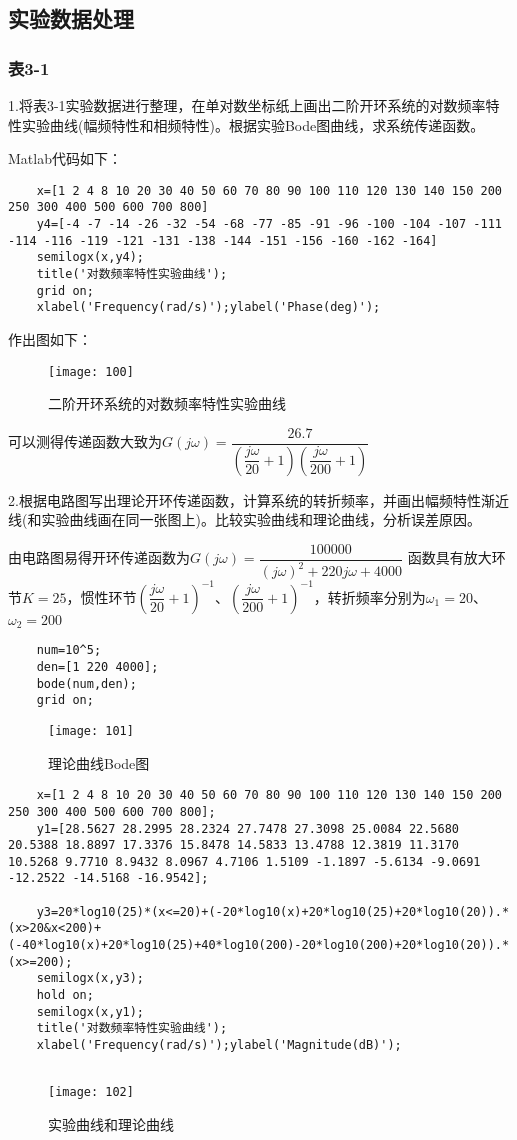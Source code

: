 \documentclass[UTF8,a4paper,10pt]{ctexart}
\begin{document}
\subsection{实验数据处理}
	\subsubsection{表3-1}
	1.将表3-1实验数据进行整理，在单对数坐标纸上画出二阶开环系统的对数频率特性实验曲线(幅频特性和相频特性)。根据实验Bode图曲线，求系统传递函数。
	
	Matlab代码如下：
    \begin{lstlisting}
    x=[1 2 4 8 10 20 30 40 50 60 70 80 90 100 110 120 130 140 150 200 250 300 400 500 600 700 800] 
    y4=[-4 -7 -14 -26 -32 -54 -68 -77 -85 -91 -96 -100 -104 -107 -111 -114 -116 -119 -121 -131 -138 -144 -151 -156 -160 -162 -164]
    semilogx(x,y4);
    title('对数频率特性实验曲线');
    grid on;
    xlabel('Frequency(rad/s)');ylabel('Phase(deg)');
    \end{lstlisting}
    作出图如下：
    \begin{figure}[h]
    	\centering
    	\texttt{[image: 100]}
    	\caption{二阶开环系统的对数频率特性实验曲线}
    \end{figure}
	可以测得传递函数大致为$G(j\omega)=\dfrac{26.7}{(\dfrac{j\omega}{20}+1)(\dfrac{j\omega}{200}+1)}$
	
	2.根据电路图写出理论开环传递函数，计算系统的转折频率，并画出幅频特性渐近线(和实验曲线画在同一张图上)。比较实验曲线和理论曲线，分析误差原因。
	
	由电路图易得开环传递函数为$G(j\omega)=\dfrac{100000}{(j\omega)^2+220j\omega+4000}$
	函数具有放大环节$K=25$，惯性环节$(\dfrac{j\omega}{20}+1)^{-1}$、$(\dfrac{j\omega}{200}+1)^{-1}$，转折频率分别为$\omega_{1}=20$、$\omega_{2}=200$
	\begin{lstlisting}
	num=10^5;
	den=[1 220 4000];
	bode(num,den);
	grid on;
	\end{lstlisting}
	\begin{figure}[h]
		\centering
		\texttt{[image: 101]}
		\caption{理论曲线Bode图}
	\end{figure}
	\begin{lstlisting}
	x=[1 2 4 8 10 20 30 40 50 60 70 80 90 100 110 120 130 140 150 200 250 300 400 500 600 700 800];
	y1=[28.5627 28.2995 28.2324 27.7478 27.3098 25.0084 22.5680 20.5388 18.8897 17.3376 15.8478 14.5833 13.4788 12.3819 11.3170 10.5268 9.7710 8.9432 8.0967 4.7106 1.5109 -1.1897 -5.6134 -9.0691 -12.2522 -14.5168 -16.9542];
	
    y3=20*log10(25)*(x<=20)+(-20*log10(x)+20*log10(25)+20*log10(20)).*(x>20&x<200)+(-40*log10(x)+20*log10(25)+40*log10(200)-20*log10(200)+20*log10(20)).*(x>=200);
	semilogx(x,y3);
	hold on;
	semilogx(x,y1);
	title('对数频率特性实验曲线');
	xlabel('Frequency(rad/s)');ylabel('Magnitude(dB)');
	
	\end{lstlisting}
    \begin{figure}[h]
    	\centering
    	\texttt{[image: 102]}
    	\caption{实验曲线和理论曲线}
    \end{figure}
\end{document}
